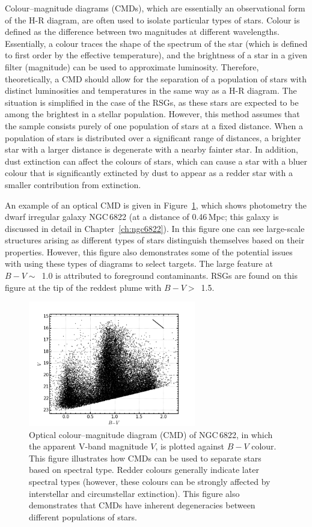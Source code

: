 Colour--magnitude diagrams (CMDs), which are essentially an observational form of the H-R diagram, are often used to isolate particular types of stars.
Colour is defined as the difference between two magnitudes at different wavelengths.
Essentially, a colour traces the shape of the spectrum of the star (which is defined to first order by the effective temperature), and the brightness of a star in a given filter (magnitude) can be used to approximate luminosity.
Therefore, theoretically, a CMD should allow for the separation of a population of stars with distinct luminosities and temperatures in the same way as a H-R diagram.
The situation is simplified in the case of the RSGs, as these stars are expected to be among the brightest in a stellar population.
However, this method assumes that the sample consists purely of one population of stars at a fixed distance.
When a population of stars is distributed over a significant range of distances, a brighter star with a larger distance is degenerate with a nearby fainter star.
In addition, dust extinction can affect the colours of stars, which can cause a star with a bluer colour that is significantly extincted by dust to appear as a redder star with a smaller contribution from extinction.

An example of an optical CMD is given in Figure~\ref{fig:CMD},
which shows photometry the dwarf irregular galaxy NGC\,6822
(at a distance of 0.46\,Mpc; this galaxy is discussed in detail in Chapter~\ref{ch:ngc6822}).
In this figure one can see large-scale structures arising as different types of stars distinguish themselves based on their properties.
However, this figure also demonstrates some of the potential issues with using these types of diagrams to select targets.
The large feature at $B-V \sim$~1.0 is attributed to foreground contaminants.
RSGs are found on this figure at the tip of the reddest plume with $B-V >$~1.5.

\begin{figure}
 \centering
 \includegraphics[width=0.65\textwidth]{intro/NGC6822_bv_CMD}
 \caption[Optical colour--magnitude diagram of NGC\,6822]{Optical colour--magnitude diagram (CMD) of NGC\,6822, in which the apparent V-band magnitude $V$, is plotted against $B-V$ colour.
This figure illustrates how CMDs can be used to separate stars based on spectral type. Redder colours generally indicate later spectral types (however, these colours can be strongly affected by interstellar and circumstellar extinction).
This figure also demonstrates that CMDs have inherent degeneracies between different populations of stars.
 \label{fig:CMD}}
\end{figure}

